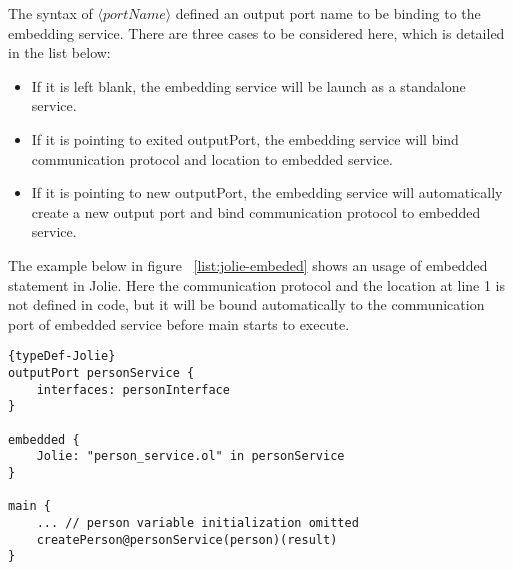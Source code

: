 The syntax of \(\langle portName \rangle\) defined an output port name to be binding to the embedding service. There are three cases to be considered here, which is detailed in the list below:

\begin{itemize}
    \item If it is left blank, the embedding service will be launch as a standalone service.
    \item If it is pointing to exited outputPort, the embedding service will bind communication protocol and location to embedded service.
    \item If it is pointing to new outputPort, the embedding service will automatically create a new output port and bind communication protocol to embedded service.
\end{itemize}

The example below in figure ~\ref{list:jolie-embeded} shows an usage of embedded statement in Jolie. Here the communication protocol and the location at line 1 is not defined in code, but it will be bound automatically to the communication port of embedded service before main starts to execute. 

\begin{listing}[ht]

\lstset{language=Jolie,
    style=codeStyle,
    numbers=left,
    firstnumber=1
}
\begin{lstlisting}[frame=tlrb, caption= {Jolie Embedding example}, label={list:jolie-embedded} ]{typeDef-Jolie}
outputPort personService {
    interfaces: personInterface
}

embedded {
    Jolie: "person_service.ol" in personService
}

main {
    ... // person variable initialization omitted
    createPerson@personService(person)(result)
}
\end{lstlisting}
\caption{Jolie Embedding example}
\label{list:jolie-embeded}
\end{listing}

\FloatBarrier
